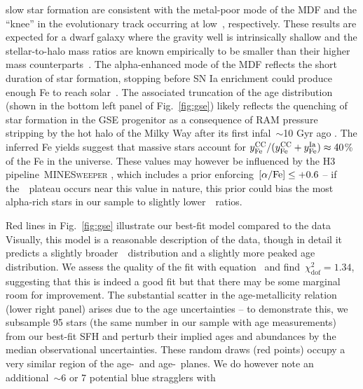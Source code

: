 \documentclass[ms.tex]{subfiles}
\begin{document}
slow star formation are consistent with the metal-poor mode of the MDF and the
``knee'' in the evolutionary track occurring at low~\feh, respectively.
These results are expected for a dwarf galaxy where the gravity well is
intrinsically shallow and the stellar-to-halo mass ratios are known empirically
to be smaller than their higher mass counterparts~\citep{Hudson2015}.
The alpha-enhanced mode of the MDF reflects the short duration of star
formation, stopping before SN Ia enrichment could produce enough Fe to reach
solar~\afe.
The associated truncation of the age distribution (shown in the bottom left
panel of Fig.~\ref{fig:gse}) likely reflects the quenching of star
formation in the GSE progenitor as a consequence of RAM pressure stripping by
the hot halo of the Milky Way after its first infal~$\sim$10 Gyr ago
\citep{Bonaca2020}.
The inferred Fe yields suggest that massive stars account for
$y_\text{Fe}^\text{CC} / (y_\text{Fe}^\text{CC} + y_\text{Fe}^\text{Ia}) \approx 40$\% of the Fe in the universe.
These values may however be influenced by the H3 pipeline~\textsc{MINESweeper}
\citep{Cargile2020}, which includes a prior enforcing~$\text{[$\alpha$/Fe]} \leq +0.6$ -- if
the~\afe~plateau occurs near this value in nature, this prior could bias the
most alpha-rich stars in our sample to slightly lower~\afe~ratios.
\par
Red lines in Fig.~\ref{fig:gse} illustrate our best-fit model compared to the
data
Visually, this model is a reasonable description of the data, though in detail
it predicts a slightly broader~\feh~distribution and a slightly more peaked age
distribution.
We assess the quality of the fit with equation~ and
find~$\chi_\text{dof}^2 = 1.34$, suggesting that this is indeed a good fit but
that there may be some marginal room for improvement.
The substantial scatter in the age-metallicity relation (lower right panel)
arises due to the age uncertainties -- to demonstrate this, we subsample 95
stars (the same number in our sample with age measurements) from our best-fit
SFH and perturb their implied ages and abundances by the median observational
uncertainties.
These random draws (red points) occupy a very similar region of the age-\feh~and
age-\afe~planes.
We do however note an additional~$\sim$6 or 7 potential blue stragglers with
\end{document}
